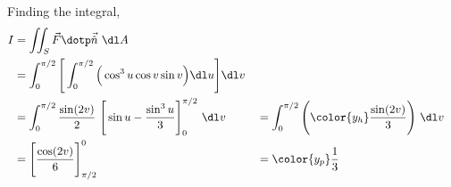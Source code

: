 \begin{enumerate}
          Finding the integral,
          \begin{align}
              I       & = \iint_S \vec{F} \dotp \vec{\hat{n}}\ \dl A     \\
                      & = \int_{0}^{\pi/2}
              \Bigg[\int_{0}^{\pi/2} \Big( \cos^3 u \cos v \sin v \Big)
              \dl u \Bigg] \dl v                                         \\
                      & = \int_{0}^{\pi/2} \frac{\sin(2v)}{2}\
              \Bigg[ \sin u - \frac{\sin^3 u}{3} \Bigg]_0^{\pi/2}
              \ \dl v &
                      & = \int_{0}^{\pi/2}
              \Bigg( {\color{y_h} \frac{\sin(2v)}{3}} \Bigg)\ \dl v      \\
                      & = \Bigg[ \frac{\cos(2v)}{6} \Bigg]_{\pi/2}^{0} &
                      & = \color{y_p} \frac{1}{3}
          \end{align}


\end{enumerate}

